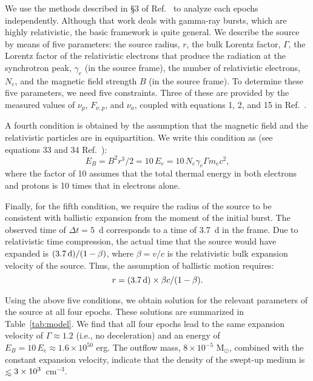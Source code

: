 We use the methods described in \S3 of Ref.~ to analyze
each epochs independently.  Although that work deals with gamma-ray
bursts, which are highly relativistic, the basic framework is quite
general.  We describe the source by means of five parameters: the
source radius, $r$, the bulk Lorentz factor, $\Gamma$, the Lorentz
factor of the relativistic electrons that produce the radiation at the
synchrotron peak, $\gamma_e$ (in the source frame), the number of
relativistic electrons, $N_e$, and the magnetic field strength $B$ (in
the source frame).  To determine these five parameters, we need five
constraints.  Three of these are provided by the measured values of
$\nu_p$, $F_{\nu,p}$, and $\nu_a$, coupled with equations 1, 2, and
15 in Ref.~.

A fourth condition is obtained by the assumption that the magnetic
field and the relativistic particles are in equipartition.  We write
this condition as (see equations 33 and 34 Ref.~):
\begin{equation}
E_B = B^2 r^3/2 = 10\,E_e = 10\,N_e\gamma_e\Gamma m_ec^2, 
\label{RN1}
\end{equation}
where the factor of 10 assumes that the total thermal energy in both
electrons and protons is 10 times that in electrons alone. 

Finally, for the fifth condition, we require the radius of the source
to be consistent with ballistic expansion from the moment of the
initial burst.  The observed time of $\Delta t=5$~d corresponds to a
time of 3.7~d in the frame.  Due to relativistic time compression, the
actual time that the source would have expanded is $(3.7\,{\rm
d})/(1-\beta)$, where $\beta=v/c$ is the relativistic bulk expansion
velocity of the source.  Thus, the assumption of ballistic motion
requires:
\begin{equation}
r = (3.7\,{\rm d})\times \beta c/(1-\beta). 
\label{RN2}
\end{equation}

Using the above five conditions, we obtain solution for the relevant
parameters of the source at all four epochs.  These solutions are
summarized in Table~\ref{tab:model}.  We find that all four epochs
lead to the same expansion velocity of $\Gamma\approx 1.2$ (i.e., no
deceleration) and an energy of $E_B = 10\,E_e\approx 1.6\times
10^{50}$ erg.  The outflow mass, $8\times 10^{-5}$ M$_\odot$, combined
with the constant expansion velocity, indicate that the density of the
swept-up medium is $\simlt 3\times 10^3$~cm$^{-3}$.


